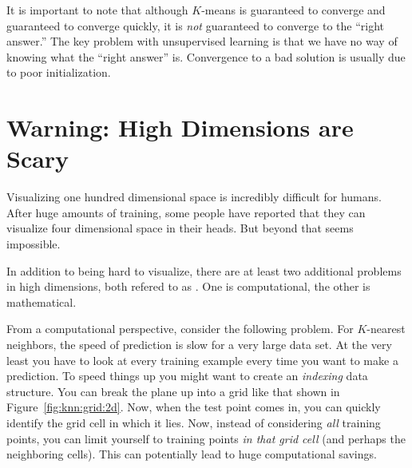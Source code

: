 
It is important to note that although $K$-means is guaranteed to
converge and guaranteed to converge quickly, it is \emph{not}
guaranteed to converge to the ``right answer.''  The key problem with
unsupervised learning is that we have no way of knowing what the
``right answer'' is.  Convergence to a bad solution is usually due to
poor initialization.


\section{Warning: High Dimensions are Scary}

Visualizing one hundred dimensional space is incredibly difficult for
humans.  After huge amounts of training, some people have reported
that they can visualize four dimensional space in their heads.  But
beyond that seems impossible.

In addition to being hard to visualize, there are at least two
additional problems in high dimensions, both refered to as
.  One is computational, the
other is mathematical.


From a computational perspective, consider the following problem.
For $K$-nearest neighbors, the speed of prediction is slow for a very
large data set.  At the very least you have to look at every training
example every time you want to make a prediction.  To speed things up
you might want to create an \emph{indexing} data structure.  You can
break the plane up into a grid like that shown in
Figure~\ref{fig:knn:grid:2d}.  Now, when the test point comes in, you can
quickly identify the grid cell in which it lies.  Now, instead of
considering \emph{all} training points, you can limit yourself to
training points \emph{in that grid cell} (and perhaps the neighboring
cells).  This can potentially lead to huge computational savings.

